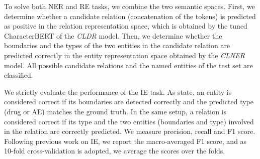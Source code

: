 \documentclass[11pt]{article}
\begin{document}
\par
To solve both NER and RE tasks, we combine the two semantic spaces. First, we determine whether a candidate relation (concatenation of the tokens) is predicted as positive in the relation representation space, which is obtained by the tuned CharacterBERT of the \textit{CLDR} model. Then, we determine whether the boundaries and the types of the two entities in the candidate relation are predicted correctly in the entity representation space obtained by the \textit{CLNER} model. All possible candidate relations and the named entities of the test set are classified.

\par
We strictly evaluate the performance of the IE task. As \cite{bekoulis2018joint} state, an entity is considered correct if its boundaries are detected correctly and the predicted type (drug or AE) matches the ground truth. In the same setup, a relation is considered correct if its type and the two entities (boundaries and type) involved in the relation are correctly predicted. We measure precision, recall and F1 score. Following previous work on IE, we report the macro-averaged F1 score, and as 10-fold cross-validation is adopted, we average the scores over the folds.

\begin{table}[!ht]
    \centering
        \vspace{-1ex}
    \caption{Test set results: macro-averaged F1 score}
    \vspace{-4mm}
\end{table}
\end{document}
